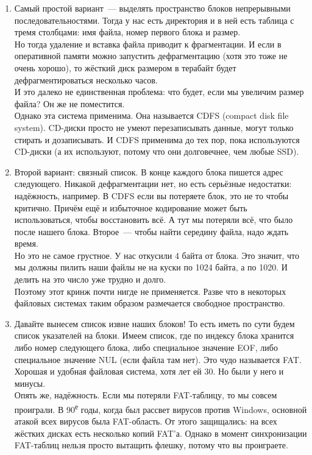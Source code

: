 \documentclass{article}
\begin{document}
    \begin{enumerate}
        \item Самый простой вариант~--- выделять пространство блоков непрерывными последовательностями. Тогда у нас есть директория и в ней есть таблица с тремя столбцами: имя файла, номер первого блока и размер.\\
        Но тогда удаление и вставка файла приводит к фрагментации. И если в оперативной памяти можно запустить дефрагментацию (хотя это тоже не очень хорошо), то жёсткий диск размером в терабайт будет дефрагментироваться несколько часов.\\
        И это далеко не единственная проблема: что будет, если мы увеличим размер файла? Он же не поместится.\\
        Однако эта система применима. Она называется CDFS (compact disk file system). CD-диски просто не умеют перезаписывать данные, могут только стирать и дозаписывать. И CDFS применима до тех пор, пока используются CD-диски (а их используют, потому что они долговечнее, чем любые SSD).
        \item Второй вариант: связный список. В конце каждого блока пишется адрес следующего. Никакой дефрагментации нет, но есть серьёзные недостатки: надёжность, например. В CDFS если вы потеряете блок, это не то чтобы критично. Причём ещё и избыточное кодирование может быть использоваться, чтобы восстановить всё. А тут мы потеряли всё, что было после нашего блока. Второе~--- чтобы найти середину файла, надо ждать время.\\
        Но это не самое грустное. У нас откусили 4 байта от блока. Это значит, что мы должны пилить наши файлы не на куски по 1024 байта, а по 1020. И делить на это число уже трудно и долго.\\
        Поэтому этот кринж почти нигде не применяется. Разве что в некоторых файловых системах таким образом размечается свободное пространство.
        \item Давайте вынесем список извне наших блоков! То есть иметь по сути будем список указателей на блоки. Имеем список, где по индексу блока хранится либо номер следующего блока, либо специальное значение EOF, либо специальное значение NUL (если файла там нет). Это чудо называется FAT. Хорошая и удобная файловая система, хотя лет ей 30. Но были у него и минусы.\\
        Опять же, надёжность. Если мы потеряли FAT-таблицу, то мы совсем проиграли. В 90\textsuperscript{е} годы, когда был рассвет вирусов против Windows, основной атакой всех вирусов была FAT-область. От этого защищались: на всех жёстких дисках есть несколько копий FAT'а. Однако в момент синхронизации FAT-таблиц нельзя просто вытащить флешку, потому что вы проиграете.\\

\end{enumerate}
\end{document}

